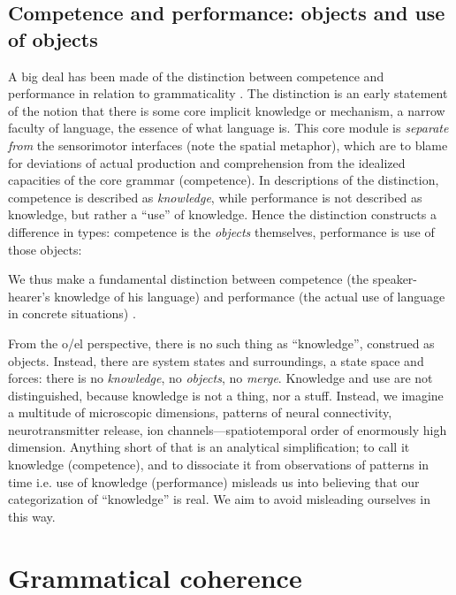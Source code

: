 \subsection{Competence and performance: objects and use of objects}

A big deal has been made of the distinction between competence and performance in relation to grammaticality \citep{Chomsky1965}. The distinction is an early statement of the notion that there is some core implicit knowledge or mechanism, a narrow faculty of language, the essence of what language is. This core module is \textit{separate from} the sensorimotor interfaces (note the spatial metaphor), which are to blame for deviations of actual production and comprehension from the idealized capacities of the core grammar (competence). In descriptions of the distinction, competence is described as \textit{knowledge}, while performance is not described as knowledge, but rather a “use” of knowledge. Hence the distinction constructs a difference in types: competence is the \textit{objects} themselves, performance is use of those objects:

We thus make a fundamental distinction between competence (the speaker-hearer's knowledge of his language) and performance (the actual use of language in concrete situations) \citep[4]{Chomsky1965}.

  From the o/el perspective, there is no such thing as “knowledge”, construed as objects. Instead, there are system states and surroundings, a state space and forces: there is no \textit{knowledge}, no \textit{objects}, no \textit{merge}. Knowledge and use are not distinguished, because knowledge is not a thing, nor a stuff. Instead, we imagine a multitude of microscopic dimensions, patterns of neural connectivity, neurotransmitter release, ion channels—spatiotemporal order of enormously high dimension. Anything short of that is an analytical simplification; to call it knowledge (competence), and to dissociate it from observations of patterns in time i.e. use of knowledge (performance) misleads us into believing that our categorization of “knowledge” is real. We aim to avoid misleading ourselves in this way.

\section{Grammatical coherence}

